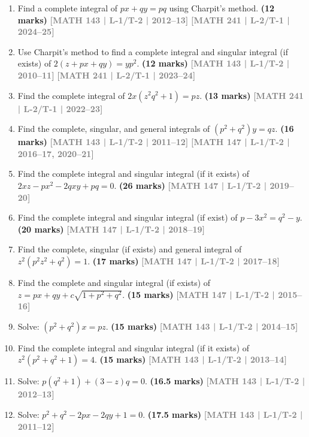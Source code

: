 \documentclass[12pt]{article}
\newcommand{\yr}[1]{\hfill\textcolor{gray}{\small\textbf{[#1]}}}
\newcommand{\mk}[1]{\textcolor{orange!70!black}{\small\textbf{(#1 marks)}}}
\begin{document}
\begin{enumerate}

\item Find a complete integral of $px+qy=pq$ using Charpit's method.
\mk{12} \yr{MATH 143 | L-1/T-2 | 2012--13} \yr{MATH 241 | L-2/T-1 | 2024--25}




\item Use Charpit's method to find a complete integral and singular integral (if exists) of $2(z+px+qy)=yp^{2}$.
\mk{12} \yr{MATH 143 | L-1/T-2 | 2010--11} \yr{MATH 241 | L-2/T-1 | 2023--24}




\item Find the complete integral of $2x(z^{2}q^{2}+1)=pz$.
\mk{13} \yr{MATH 241 | L-2/T-1 | 2022--23}




\item Find the complete, singular, and general integrals of $(p^{2}+q^{2})y=qz$.
\mk{16} \yr{MATH 143 | L-1/T-2 | 2011--12} \yr{MATH 147 | L-1/T-2 | 2016--17, 2020--21}




\item Find the complete integral and singular integral (if it exists) of $2xz-px^{2}-2qxy+pq=0$.
\mk{26} \yr{MATH 147 | L-1/T-2 | 2019--20}




\item Find the complete integral and singular integral (if exist) of $p-3x^{2}=q^{2}-y$.
\mk{20} \yr{MATH 147 | L-1/T-2 | 2018--19}




\item Find the complete, singular (if exists) and general integral of $z^{2}(p^{2}z^{2}+q^{2})=1$.
\mk{17} \yr{MATH 147 | L-1/T-2 | 2017--18}




\item Find the complete and singular integral (if exists) of $z=px+qy+c\sqrt{1+p^{2}+q^{2}}$.
\mk{15} \yr{MATH 147 | L-1/T-2 | 2015--16}




\item Solve: $(p^{2}+q^{2})x=pz$.
\mk{15} \yr{MATH 143 | L-1/T-2 | 2014--15}




\item Find the complete integral and singular integral (if it exists) of $z^{2}(p^{2}+q^{2}+1)=4$.
\mk{15} \yr{MATH 143 | L-1/T-2 | 2013--14}




\item Solve: $p(q^{2}+1)+(3-z)q=0$.
\mk{16.5} \yr{MATH 143 | L-1/T-2 | 2012--13}




\item Solve: $p^{2}+q^{2}-2px-2qy+1=0$.
\mk{17.5} \yr{MATH 143 | L-1/T-2 | 2011--12}





\end{enumerate}
\end{document}
